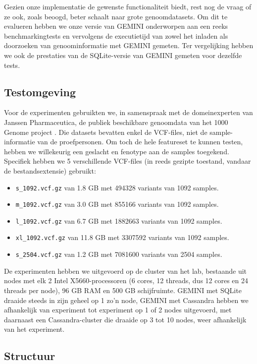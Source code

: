 Gezien onze implementatie de gewenste functionaliteit biedt, rest nog de vraag of ze ook, zoals beoogd, beter schaalt naar grote genoomdatasets. Om dit te evalueren hebben we onze versie van GEMINI onderworpen aan een reeks benchmarkingtests en vervolgens de executietijd van zowel het inladen als doorzoeken van genoominformatie met GEMINI gemeten. Ter vergelijking hebben we ook de prestaties van de SQLite-versie van GEMINI gemeten voor dezelfde tests.

\subsection*{Testomgeving}

Voor de experimenten gebruikten we, in samenspraak met de domeinexperten van Janssen Pharmaceutica, de publiek beschikbare genoomdata van het 1000 Genome project \cite{10002012integrated}. Die datasets bevatten enkel de VCF-files, niet de sample-informatie van de proefpersonen. Om toch de hele featureset te kunnen testen, hebben we willekeurig een geslacht en fenotype aan de samples toegekend. Specifiek hebben we 5 verschillende VCF-files (in reeds gezipte toestand, vandaar de bestandsextensie) gebruikt:
\begin{itemize}
\item \texttt{s\_1092.vcf.gz} van 1.8 GB met 494328 variants van 1092 samples.
\item \texttt{m\_1092.vcf.gz} van 3.0 GB met 855166 variants van 1092 samples.
\item \texttt{l\_1092.vcf.gz} van 6.7 GB met 1882663 variants van 1092 samples.
\item \texttt{xl\_1092.vcf.gz} van 11.8 GB met 3307592 variants van 1092 samples.
\item \texttt{s\_2504.vcf.gz} van 1.2 GB met 7081600 variants van 2504 samples.
\end{itemize}

De experimenten hebben we uitgevoerd op de cluster van het lab, bestaande uit nodes met elk 2 Intel X5660-processoren (6 cores, 12 threads, dus 12 cores en 24 threads per node), 96 GB RAM en 500 GB schijfruimte. GEMINI met SQLite draaide steeds in zijn geheel op 1 zo'n node, GEMINI met Cassandra hebben we afhankelijk van experiment tot experiment op 1 of 2 nodes uitgevoerd, met daarnaast een Cassandra-cluster die draaide op 3 tot 10 nodes, weer afhankelijk van het experiment.

\subsection*{Structuur}

